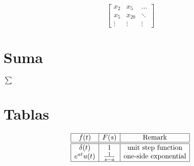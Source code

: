 \documentclass[letterpaper,12pt,oneside]{article}
\begin{document}
	\[
	\begin{bmatrix}
	x_{2} & x_{5} & \dots\\
	x_{5} & x_{20} & \ddots\\
	\vdots & \vdots & \vdots
	\end{bmatrix}
	\]

	\section*{Suma}
	$\sum$



	\section*{Tablas}
	\[
	\begin{array}{|c|c|c|}
	\hline
	f(t) & F(s) & \mbox{Remark}\\
	\hline\hline
	\delta(t) & 1 & \mbox{unit step function}\\
	e^{at}u(t) & \frac{1}{s-a} & \mbox{one-side exponential}\\
	\hline
	\end{array}
	\]
\end{document}
